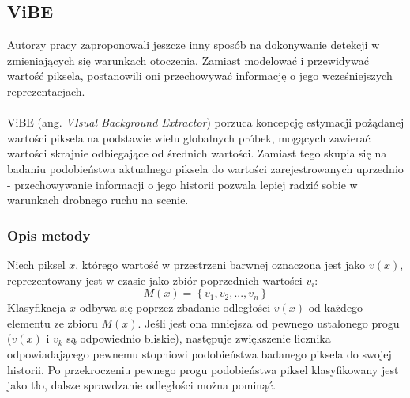 \subsection{ViBE}
Autorzy pracy \cite{barnich2011vibe} zaproponowali jeszcze inny sposób na dokonywanie detekcji w zmieniających się warunkach otoczenia. Zamiast modelować i przewidywać wartość piksela, postanowili oni przechowywać informację o jego wcześniejszych reprezentacjach.
\paragraph{}
ViBE (ang. \textit{VIsual Background Extractor}) porzuca koncepcję estymacji pożądanej wartości piksela na podstawie wielu globalnych próbek, mogących zawierać wartości skrajnie odbiegające od średnich wartości. Zamiast tego skupia się na badaniu podobieństwa aktualnego piksela do wartości zarejestrowanych uprzednio - przechowywanie informacji o jego historii pozwala lepiej radzić sobie w warunkach drobnego ruchu na scenie.
\subsubsection{Opis metody}
Niech piksel $x$, którego wartość w przestrzeni barwnej oznaczona jest jako $v(x)$, reprezentowany jest w czasie jako zbiór poprzednich wartości $v_{i}$:
\begin{equation}
\label{eq:prevValVibe}
M(x) = \left\{v_{1}, v_{2}, ..., v_{n}\right\}
\end{equation}
Klasyfikacja $x$ odbywa się poprzez zbadanie odległości $v(x)$ od każdego elementu ze zbioru $M(x)$. Jeśli jest ona mniejsza od pewnego ustalonego progu ($v(x)$ i $v_{k}$ są odpowiednio bliskie), następuje zwiększenie licznika odpowiadającego pewnemu stopniowi podobieństwa badanego piksela do swojej historii. Po przekroczeniu pewnego progu podobieństwa piksel klasyfikowany jest jako tło, dalsze sprawdzanie odległości można pominąć.
